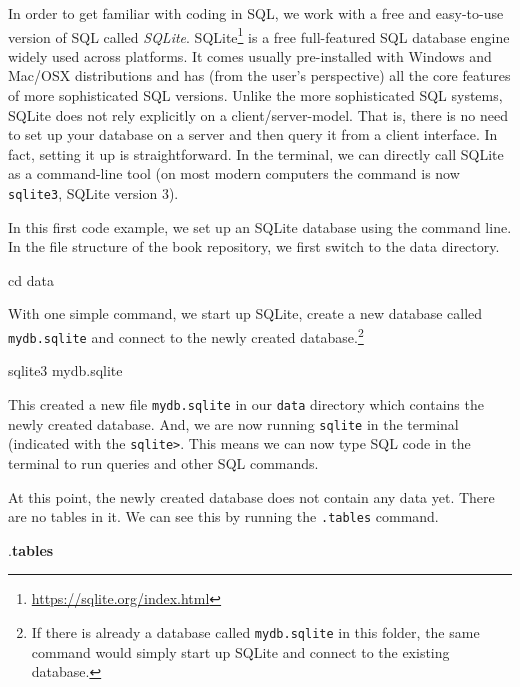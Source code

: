 \documentclass[
  12pt,
]{style/krantz}
\newenvironment{Shaded}{\begin{snugshade}}{\end{snugshade}}
\newcommand{\BuiltInTok}[1]{#1}
\newcommand{\ExtensionTok}[1]{#1}
\newcommand{\KeywordTok}[1]{\textcolor[rgb]{0.13,0.29,0.53}{\textbf{#1}}}
\newcommand{\NormalTok}[1]{#1}
\renewcommand{\href}[2]{#2\footnote{\url{#1}}}
\begin{document}
In order to get familiar with coding in SQL, we work with a free and easy-to-use version of SQL called \emph{SQLite}. \href{https://sqlite.org/index.html}{SQLite} is a free full-featured SQL database engine widely used across platforms. It comes usually pre-installed with Windows and Mac/OSX distributions and has (from the user's perspective) all the core features of more sophisticated SQL versions. Unlike the more sophisticated SQL systems, SQLite does not rely explicitly on a client/server-model. That is, there is no need to set up your database on a server and then query it from a client interface. In fact, setting it up is straightforward. In the terminal, we can directly call SQLite as a command-line tool (on most modern computers the command is now \texttt{sqlite3}, SQLite version 3).

In this first code example, we set up an SQLite database using the command line. In the file structure of the book repository, we first switch to the data directory.

\begin{Shaded}
\begin{Highlighting}[]
\BuiltInTok{cd}\NormalTok{ data }
\end{Highlighting}
\end{Shaded}

With one simple command, we start up SQLite, create a new database called \texttt{mydb.sqlite} and connect to the newly created database.\footnote{If there is already a database called \texttt{mydb.sqlite} in this folder, the same command would simply start up SQLite and connect to the existing database.}

\begin{Shaded}
\begin{Highlighting}[]
\ExtensionTok{sqlite3}\NormalTok{ mydb.sqlite}
\end{Highlighting}
\end{Shaded}

This created a new file \texttt{mydb.sqlite} in our \texttt{data} directory which contains the newly created database. And, we are now running \texttt{sqlite} in the terminal (indicated with the \texttt{sqlite\textgreater{}}. This means we can now type SQL code in the terminal to run queries and other SQL commands.

At this point, the newly created database does not contain any data yet. There are no tables in it. We can see this by running the \texttt{.tables} command.

\begin{Shaded}
\begin{Highlighting}[]
\NormalTok{.}\KeywordTok{tables}
\end{Highlighting}
\end{Shaded}
\end{document}
